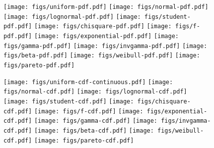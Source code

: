 \documentclass[landscape]{article}
\begin{document}
\begin{figure}[H]
  \texttt{[image: figs/uniform-pdf.pdf]}
  \texttt{[image: figs/normal-pdf.pdf]}
  \texttt{[image: figs/lognormal-pdf.pdf]}
  \texttt{[image: figs/student-pdf.pdf]}
  \texttt{[image: figs/chisquare-pdf.pdf]}
  \texttt{[image: figs/f-pdf.pdf]}
  \texttt{[image: figs/exponential-pdf.pdf]}
  \texttt{[image: figs/gamma-pdf.pdf]}
  \texttt{[image: figs/invgamma-pdf.pdf]}
  \texttt{[image: figs/beta-pdf.pdf]}
  \texttt{[image: figs/weibull-pdf.pdf]}
  \texttt{[image: figs/pareto-pdf.pdf]}
\end{figure}

\begin{figure}[H]
  \texttt{[image: figs/uniform-cdf-continuous.pdf]}
  \texttt{[image: figs/normal-cdf.pdf]}
  \texttt{[image: figs/lognormal-cdf.pdf]}
  \texttt{[image: figs/student-cdf.pdf]}
  \texttt{[image: figs/chisquare-cdf.pdf]}
  \texttt{[image: figs/f-cdf.pdf]}
  \texttt{[image: figs/exponential-cdf.pdf]}
  \texttt{[image: figs/gamma-cdf.pdf]}
  \texttt{[image: figs/invgamma-cdf.pdf]}
  \texttt{[image: figs/beta-cdf.pdf]}
  \texttt{[image: figs/weibull-cdf.pdf]}
  \texttt{[image: figs/pareto-cdf.pdf]}
\end{figure}
\end{document}
